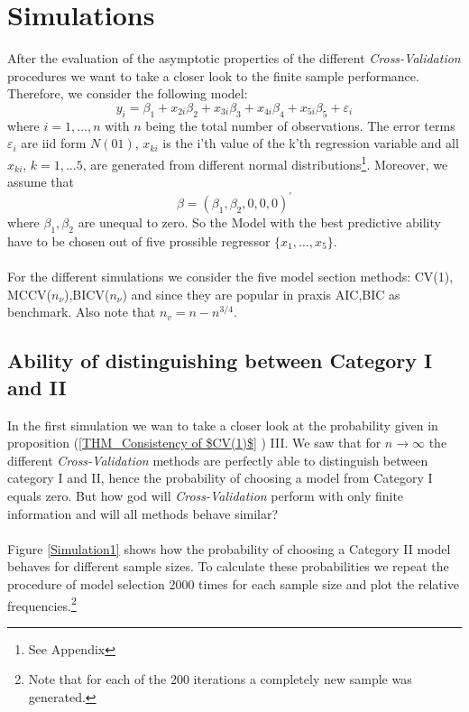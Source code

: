 \documentclass[Research_Module_ES.tex]{subfiles}
\begin{document}
\section{Simulations}
After the evaluation of the asymptotic properties of the different \textit{Cross-Validation} procedures we want to take a closer look to the finite sample performance. Therefore, we consider the following model:
\[
	y_i=\beta_1+x_{2i}\beta_2+x_{3i}\beta_3+x_{4i}\beta_4+x_{5i}\beta_5+\varepsilon_i
\]
where $i=1,\ldots,n$ with $n$ being the total number of observations. The error terms $\varepsilon_i$ are iid form $N(01)$,  $x_{ki}$ is the i'th value of the k'th regression variable and all $x_{ki}$, $k=1,\ldots5$, are generated from different normal distributions\footnote{See Appendix}. Moreover, we assume that
\[
	\beta=(\beta_1,\beta_2,0,0,0)^\prime
\]
where $\beta_1,\beta_2$ are unequal to zero. So the Model with the best predictive ability have to be chosen out of five prossible regressor $\{x_1,\ldots,x_5\}$. \\
\\
For the different simulations we consider the five model section methods: CV(1), MCCV($n_\nu$),BICV($n_\nu$) and since they are popular in praxis AIC,BIC as benchmark. Also note that $n_v=n-n^{3/4}$.

\subsection{Ability of distinguishing between Category I and II }
In the first simulation we wan to take a closer look at the probability given in proposition (\ref{THM_Consistency of $CV(1)$} ) III. We saw that for $n\to\infty$ the different \textit{Cross-Validation} methods are perfectly able to distinguish between category I and II, hence the probability of choosing a model from Category I equals zero. But how god will \textit{Cross-Validation} perform with only finite information and will all methods behave similar?\\
\\
Figure \ref{Simulation1} shows how the probability of choosing a Category II model behaves for different sample sizes. To calculate these probabilities we repeat the procedure of model selection 2000 times for each sample size and plot the relative frequencies.\footnote{Note that for each of the 200 iterations a completely new sample was generated.}
\end{document}
